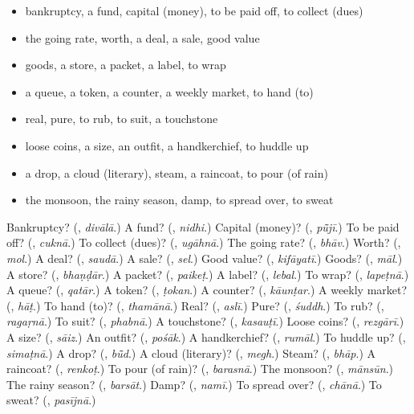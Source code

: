\begin{itemize}
\raggedright
  \item bankruptcy, a fund, capital (money), to be paid off, to collect (dues)
  \item the going rate, worth, a deal, a sale, good value
  \item goods, a store, a packet, a label, to wrap
  \item a queue, a token, a counter, a weekly market, to hand (to)
  \item real, pure, to rub, to suit, a touchstone
  \item loose coins, a size, an outfit, a handkerchief, to huddle up
  \item a drop, a cloud (literary), steam, a raincoat, to pour (of rain)
  \item the monsoon, the rainy season, damp, to spread over, to sweat
\end{itemize}

\begin{tcolorbox}[breakable,colback=teal!4,colframe=teal!35!black,title={Before you move on}]
Bankruptcy? (\textbf{}, \emph{divālā}.) A fund? (\textbf{}, \emph{nidhi}.) Capital (money)? (\textbf{}, \emph{pū̃jī}.) To be paid off? (\textbf{}, \emph{cuknā}.) To collect (dues)? (\textbf{}, \emph{ugāhnā}.) The going rate? (\textbf{}, \emph{bhāv}.) Worth? (\textbf{}, \emph{mol}.) A deal? (\textbf{}, \emph{saudā}.) A sale? (\textbf{}, \emph{sel}.) Good value? (\textbf{}, \emph{kifāyatī}.) Goods? (\textbf{}, \emph{māl}.) A store? (\textbf{}, \emph{bhaṇḍār}.) A packet? (\textbf{}, \emph{paikeṭ}.) A label? (\textbf{}, \emph{lebal}.) To wrap? (\textbf{}, \emph{lapeṭnā}.) A queue? (\textbf{}, \emph{qatār}.) A token? (\textbf{}, \emph{ṭokan}.) A counter? (\textbf{}, \emph{kāunṭar}.) A weekly market? (\textbf{}, \emph{hāṭ}.) To hand (to)? (\textbf{}, \emph{thamānā}.) Real? (\textbf{}, \emph{aslī}.) Pure? (\textbf{}, \emph{śuddh}.) To rub? (\textbf{}, \emph{ragaṛnā}.) To suit? (\textbf{}, \emph{phabnā}.) A touchstone? (\textbf{}, \emph{kasauṭī}.) Loose coins? (\textbf{}, \emph{rezgārī}.) A size? (\textbf{}, \emph{sāiz}.) An outfit? (\textbf{}, \emph{pośāk}.) A handkerchief? (\textbf{}, \emph{rumāl}.) To huddle up? (\textbf{}, \emph{simaṭnā}.) A drop? (\textbf{}, \emph{bū̃d}.) A cloud (literary)? (\textbf{}, \emph{megh}.) Steam? (\textbf{}, \emph{bhāp}.) A raincoat? (\textbf{}, \emph{renkoṭ}.) To pour (of rain)? (\textbf{}, \emph{barasnā}.) The monsoon? (\textbf{}, \emph{mānsūn}.) The rainy season? (\textbf{}, \emph{barsāt}.) Damp? (\textbf{}, \emph{namī}.) To spread over? (\textbf{}, \emph{chānā}.) To sweat? (\textbf{}, \emph{pasījnā}.)
\end{tcolorbox}
